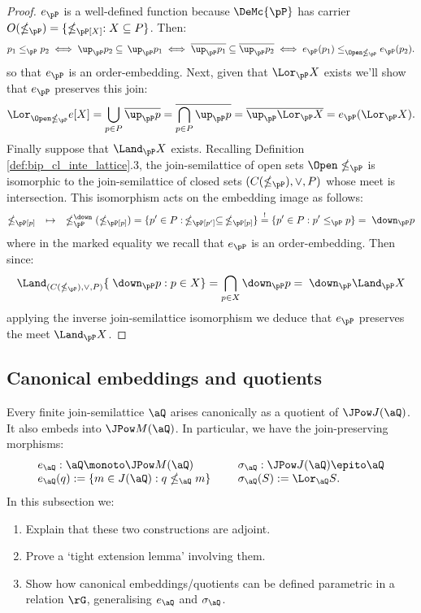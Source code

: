 \documentclass{article}
\begin{document}
\begin{proof}
$e_\pP$ is a well-defined function because $\DeMc{\pP}$ has carrier $O(\nleq_\pP) = \{ \nleq_\pP[X] : X \subseteq P \}$. Then:
\[
p_1 \leq_\pP p_2
\iff \up_\pP p_2 \subseteq \, \up_\pP p_1
\iff \overline{\up_\pP p_1} \subseteq \overline{\up_\pP p_2}
\iff e_\pP(p_1) \leq_{\Open\nleq_\pP} e_\pP(p_2).
\]
so that $e_\pP$ is an order-embedding. Next, given that $\Lor_\pP X$ exists we'll show that $e_\pP$ preserves this join:
\[
\Lor_{\Open\nleq_\pP} e[X]
= \bigcup_{p \in P} \overline{\up_\pP p} 
= \overline{\bigcap_{p \in P} \up_\pP p }
= \overline{\up_\pP \Lor_\pP X}
= e_\pP(\Lor_\pP X).
\]
Finally suppose that $\Land_\pP X$ exists. Recalling Definition \ref{def:bip_cl_inte_lattice}.3, the join-semilattice of open sets $\Open\nleq_\pP$ is isomorphic to the join-semilattice of closed sets $(C(\nleq_\pP),\lor,P)$ whose meet is intersection. This isomorphism acts on the embedding image as follows:
\[
\nleq_\pP[p]
\quad\mapsto\quad \nleq_\pP^\down(\nleq_\pP[p]) 
= \{ p' \in P : \,\nleq_\pP[p'] \subseteq \,\nleq_\pP[p] \}
\stackrel{!}{=} \{ p' \in P : p' \leq_\pP p \}
= \; \down_\pP p
\]
where in the marked equality we recall that $e_\pP$ is an order-embedding. Then since:
\[
\Land_{(C(\nleq_\pP),\lor,P)} \{ \; \down_\pP p : p \in X \}
= \bigcap_{p \in X} \down_\pP p
= \;\down_\pP \Land_\pP X
\]
applying the inverse join-semilattice isomorphism we deduce that $e_\pP$ preserves the meet $\Land_\pP X$.
\end{proof}


\subsection{Canonical embeddings and quotients}

Every finite join-semilattice $\aQ$ arises canonically as a quotient of $\JPow J(\aQ)$. It also embeds into $\JPow M(\aQ)$. In particular, we have the join-preserving morphisms:
\[
\begin{tabular}{lll}
$e_\aQ : \aQ \monoto \JPow M(\aQ)$
&& $\sigma_\aQ : \JPow J(\aQ) \epito \aQ$
\\
$e_\aQ(q) := \{ m \in J(\aQ) : q \nleq_\aQ m \}$
&& $\sigma_\aQ(S) := \Lor_\aQ S$.
\end{tabular}
\]
In this subsection we:
\begin{enumerate}
\item
Explain that these two constructions are adjoint.
\item
Prove a `tight extension lemma' involving them.
\item
Show how canonical embeddings/quotients can be defined parametric in a relation $\rG$,  generalising $e_\aQ$ and $\sigma_\aQ$.
\end{enumerate}
\end{document}
